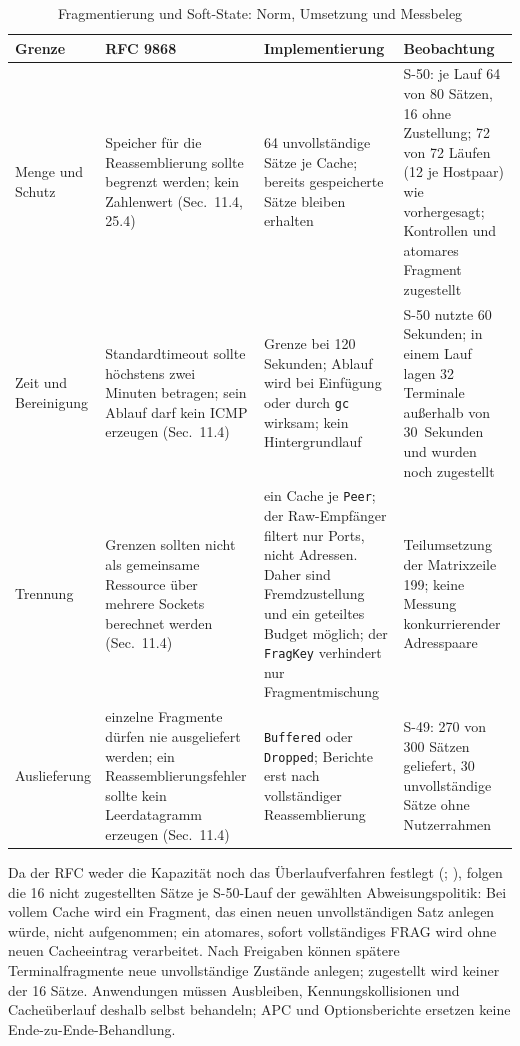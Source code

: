 \begin{table}[!htb]
    \centering
    \caption{Fragmentierung und Soft-State: Norm, Umsetzung und Messbeleg}
    \label{tab:eval-frag-softstate}
    \footnotesize
    \setlength{\tabcolsep}{3pt}
    \renewcommand{\arraystretch}{1.05}
    \begin{tabularx}{\textwidth}{@{}L{2.1cm}YYY@{}}
        \toprule
        \textbf{Grenze} & \textbf{RFC 9868} & \textbf{Implementierung} & \textbf{Beobachtung} \\
        \midrule
        Menge und Schutz & Speicher für die Reassemblierung sollte begrenzt werden; kein Zahlenwert
        (Sec.~11.4, 25.4) & 64 unvollständige Sätze je Cache; bereits gespeicherte Sätze bleiben erhalten &
        S-50: je Lauf 64 von 80 Sätzen, 16 ohne Zustellung; 72 von 72 Läufen (12 je Hostpaar) wie
        vorhergesagt; Kontrollen und atomares Fragment zugestellt \\
        Zeit und Bereinigung & Standardtimeout sollte höchstens zwei Minuten betragen; sein Ablauf darf
        kein ICMP erzeugen (Sec.~11.4) & Grenze bei 120 Sekunden; Ablauf wird bei Einfügung oder durch
        \texttt{gc} wirksam; kein Hintergrundlauf & S-50 nutzte 60 Sekunden; in einem Lauf lagen 32
        Terminale außerhalb von 30~Sekunden und wurden noch zugestellt \\
        Trennung & Grenzen sollten nicht als gemeinsame Ressource über mehrere Sockets berechnet werden
        (Sec.~11.4) & ein Cache je \texttt{Peer}; der Raw-Empfänger filtert nur Ports, nicht Adressen.
        Daher sind Fremdzustellung und ein geteiltes Budget möglich; der \texttt{FragKey} verhindert nur
        Fragmentmischung & Teilumsetzung der Matrixzeile 199; keine Messung konkurrierender Adresspaare \\
        Auslieferung & einzelne Fragmente dürfen nie ausgeliefert werden; ein Reassemblierungsfehler
        sollte kein Leerdatagramm erzeugen (Sec.~11.4) & \texttt{Buffered} oder \texttt{Dropped};
        Berichte erst nach vollständiger Reassemblierung & S-49: 270 von 300 Sätzen geliefert,
        30 unvollständige Sätze ohne Nutzerrahmen \\
        \bottomrule
    \end{tabularx}
\end{table}

Da der RFC weder die Kapazität noch das Überlaufverfahren festlegt (;
\cite[Sec.~11.4, 25.4]{rfc9868}), folgen die 16 nicht zugestellten Sätze je S-50-Lauf der gewählten
Abweisungspolitik: Bei vollem Cache wird ein Fragment, das einen neuen unvollständigen Satz anlegen
würde, nicht aufgenommen; ein atomares, sofort vollständiges FRAG wird ohne neuen Cacheeintrag
verarbeitet. Nach Freigaben können spätere Terminalfragmente neue unvollständige Zustände anlegen;
zugestellt wird keiner der 16 Sätze. Anwendungen müssen Ausbleiben, Kennungskollisionen und Cacheüberlauf
deshalb selbst behandeln; APC und Optionsberichte ersetzen keine Ende-zu-Ende-Behandlung.


